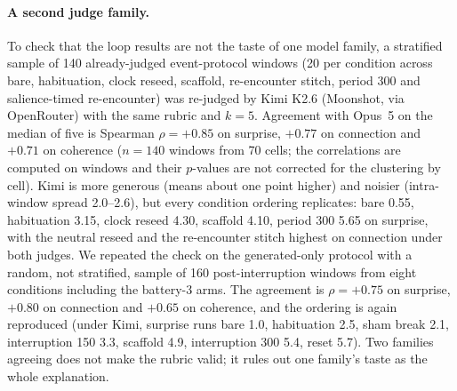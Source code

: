 \paragraph{A second judge family.} To check that the loop results are not
the taste of one model family, a stratified sample of 140 already-judged
event-protocol windows (20 per condition across bare, habituation, clock
reseed, scaffold, re-encounter stitch, period 300 and salience-timed
re-encounter) was re-judged by Kimi K2.6 (Moonshot, via OpenRouter) with the
same rubric and $k=5$. Agreement with Opus~5 on the median of five is
Spearman $\rho=+0.85$ on surprise, $+0.77$ on connection and $+0.71$ on
coherence ($n=140$ windows from 70 cells; the correlations are computed on
windows and their $p$-values are not corrected for the clustering by cell).
Kimi is more generous (means about one point higher) and noisier
(intra-window spread 2.0--2.6), but every condition ordering replicates:
bare 0.55, habituation 3.15, clock reseed 4.30, scaffold 4.10, period 300
5.65 on surprise, with the neutral reseed and the re-encounter stitch
highest on connection under both judges. We repeated the check on the
generated-only protocol with a random, not stratified, sample of 160
post-interruption windows from eight conditions including the battery-3
arms. The agreement is $\rho=+0.75$ on surprise, $+0.80$ on connection and
$+0.65$ on coherence, and the ordering is again reproduced (under Kimi,
surprise runs bare 1.0, habituation 2.5, sham break 2.1, interruption 150
3.3, scaffold 4.9, interruption 300 5.4, reset 5.7). Two families agreeing
does not make the rubric valid; it rules out one family's taste as the whole
explanation.

